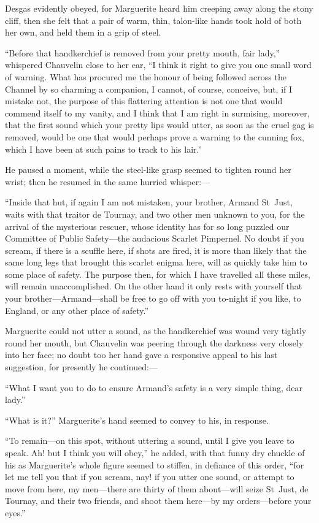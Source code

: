 Desgas evidently obeyed, for Marguerite heard him creeping away along the stony cliff, then she felt that a pair of warm, thin, talon-like hands took hold of both her own, and held them in a grip of steel.

\enquote{Before that handkerchief is removed from your pretty mouth, fair lady,} whispered Chauvelin close to her ear, \enquote{I think it right to give you one small word of warning. What has procured me the honour of being followed across the Channel by so charming a companion, I cannot, of course, conceive, but, if I mistake not, the purpose of this flattering attention is not one that would commend itself to my vanity, and I think that I am right in surmising, moreover, that the first sound which your pretty lips would utter, as soon as the cruel gag is removed, would be one that would perhaps prove a warning to the cunning fox, which I have been at such pains to track to his lair.}

He paused a moment, while the steel-like grasp seemed to tighten round her wrist; then he resumed in the same hurried whisper:---

\enquote{Inside that hut, if again I am not mistaken, your brother, Armand St~Just, waits with that traitor de Tournay, and two other men unknown to you, for the arrival of the mysterious rescuer, whose identity has for so long puzzled our Committee of Public Safety---the audacious Scarlet Pimpernel. No doubt if you scream, if there is a scuffle here, if shots are fired, it is more than likely that the same long legs that brought this scarlet enigma here, will as quickly take him to some place of safety. The purpose then, for which I have travelled all these miles, will remain unaccomplished. On the other hand it only rests with yourself that your brother---Armand---shall be free to go off with you to-night if you like, to England, or any other place of safety.}

Marguerite could not utter a sound, as the handkerchief was wound very tightly round her mouth, but Chauvelin was peering through the darkness very closely into her face; no doubt too her hand gave a responsive appeal to his last suggestion, for presently he continued:---

\enquote{What I want you to do to ensure Armand's safety is a very simple thing, dear lady.}

\enquote{What is it?} Marguerite's hand seemed to convey to his, in response.

\enquote{To remain---on this spot, without uttering a sound, until I give you leave to speak. Ah! but I think you will obey,} he added, with that funny dry chuckle of his as Marguerite's whole figure seemed to stiffen, in defiance of this order, \enquote{for let me tell you that if you scream, nay! if you utter one sound, or attempt to move from here, my men---there are thirty of them about---will seize St~Just, de Tournay, and their two friends, and shoot them here---by my orders---before your eyes.}

